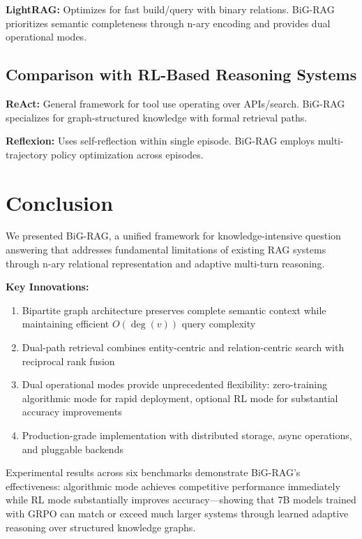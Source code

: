 \documentclass[11pt,a4paper]{article}
\begin{document}
\textbf{LightRAG:} Optimizes for fast build/query with binary relations. BiG-RAG prioritizes semantic completeness through n-ary encoding and provides dual operational modes.

\subsection{Comparison with RL-Based Reasoning Systems}

\textbf{ReAct:} General framework for tool use operating over APIs/search. BiG-RAG specializes for graph-structured knowledge with formal retrieval paths.

\textbf{Reflexion:} Uses self-reflection within single episode. BiG-RAG employs multi-trajectory policy optimization across episodes.

\section{Conclusion}

We presented BiG-RAG, a unified framework for knowledge-intensive question answering that addresses fundamental limitations of existing RAG systems through n-ary relational representation and adaptive multi-turn reasoning.

\textbf{Key Innovations:}

\begin{enumerate}
    \item Bipartite graph architecture preserves complete semantic context while maintaining efficient $O(\deg(v))$ query complexity

    \item Dual-path retrieval combines entity-centric and relation-centric search with reciprocal rank fusion

    \item Dual operational modes provide unprecedented flexibility: zero-training algorithmic mode for rapid deployment, optional RL mode for substantial accuracy improvements

    \item Production-grade implementation with distributed storage, async operations, and pluggable backends
\end{enumerate}

Experimental results across six benchmarks demonstrate BiG-RAG's effectiveness: algorithmic mode achieves competitive performance immediately while RL mode substantially improves accuracy---showing that 7B models trained with GRPO can match or exceed much larger systems through learned adaptive reasoning over structured knowledge graphs.
\end{document}
